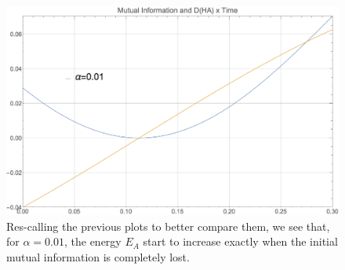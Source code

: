 \documentclass{_mypackages/monograph}
\begin{document}
\begin{figure}
    \centering
    \includegraphics[width=\textwidth]{Landi7_MutDHA.png}
    \caption{Res-calling the previous plots to better compare them, we see that, for \(\alpha=0.01\), the energy \(E_A\) start to increase exactly when the initial mutual information is completely lost.}
    \label{fig:mutDHA}
\end{figure}




































\end{document}
